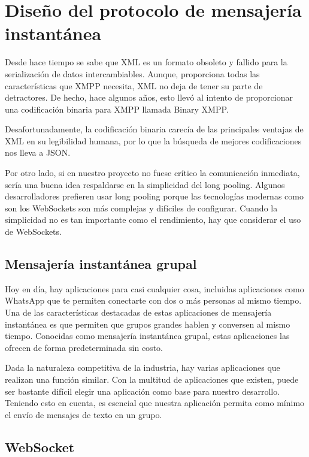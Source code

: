 \section{Diseño del protocolo de mensajería instantánea}

Desde hace tiempo se sabe que XML es un formato obsoleto y fallido para la serialización de datos intercambiables. Aunque, proporciona todas las características que XMPP necesita, XML no deja de tener su parte de detractores. De hecho, hace algunos años, esto llevó al intento de proporcionar una codificación binaria para XMPP llamada Binary XMPP.

Desafortunadamente, la codificación binaria carecía de las principales ventajas de XML en su legibilidad humana, por lo que la búsqueda de mejores codificaciones nos lleva a JSON.

Por otro lado, si en nuestro proyecto no fuese crítico la comunicación inmediata, sería una buena idea respaldarse en la simplicidad del long pooling. Algunos desarrolladores prefieren usar long pooling porque las tecnologías modernas como son los WebSockets son más complejas y difíciles de configurar. Cuando la simplicidad no es tan importante como el rendimiento, hay que considerar el uso de WebSockets.

\subsection{Mensajería instantánea grupal}

Hoy en día, hay aplicaciones para casi cualquier cosa, incluidas aplicaciones como WhatsApp que te permiten conectarte con dos o más personas al mismo tiempo. Una de las características destacadas de estas aplicaciones de mensajería instantánea es que permiten que grupos grandes hablen y conversen al mismo tiempo. Conocidas como mensajería instantánea grupal, estas aplicaciones las ofrecen de forma predeterminada sin costo.

Dada la naturaleza competitiva de la industria, hay varias aplicaciones que realizan una función similar. Con la multitud de aplicaciones que existen, puede ser bastante difícil elegir una aplicación como base para nuestro desarrollo. Teniendo esto en cuenta, es esencial que nuestra aplicación permita como mínimo el envío de mensajes de texto en un grupo.

\subsection{WebSocket}

